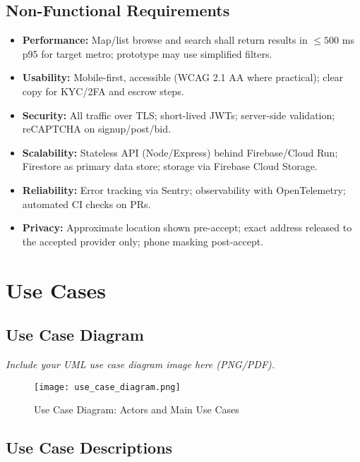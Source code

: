 \documentclass[11pt]{article}
\begin{document}
\subsection{Non-Functional Requirements}
\begin{itemize}[leftmargin=1.4em]
  \item \textbf{Performance:} Map/list browse and search shall return results in \(\leq 500\) ms p95 for target metro; prototype may use simplified filters.
  \item \textbf{Usability:} Mobile-first, accessible (WCAG 2.1 AA where practical); clear copy for KYC/2FA and escrow steps.
  \item \textbf{Security:} All traffic over TLS; short-lived JWTs; server-side validation; reCAPTCHA on signup/post/bid.
  \item \textbf{Scalability:} Stateless API (Node/Express) behind Firebase/Cloud Run; Firestore as primary data store; storage via Firebase Cloud Storage.
  \item \textbf{Reliability:} Error tracking via Sentry; observability with OpenTelemetry; automated CI checks on PRs.
  \item \textbf{Privacy:} Approximate location shown pre-accept; exact address released to the accepted provider only; phone masking post-accept.
\end{itemize}

\section{Use Cases}

\subsection{Use Case Diagram}
\noindent\textit{Include your UML use case diagram image here (PNG/PDF).}\\[4pt]
\begin{figure}[h]
  \centering
  \texttt{[image: use\_case\_diagram.png]} %
  \caption{Use Case Diagram: Actors and Main Use Cases}
\end{figure}

\subsection{Use Case Descriptions}
\end{document}
